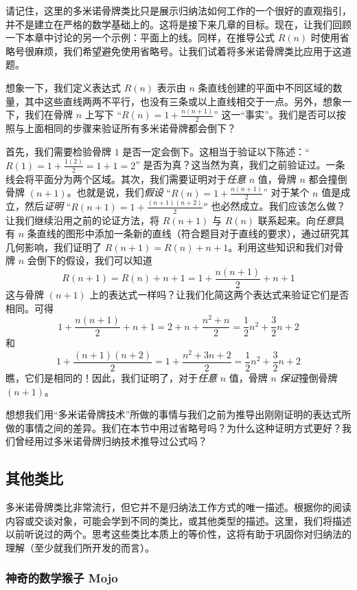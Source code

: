请记住，这里的多米诺骨牌类比只是展示归纳法如何工作的一个很好的直观指引，并不是建立在严格的数学基础上的。这将是接下来几章的目标。现在，让我们回顾一下本章中讨论的另一个示例：平面上的线。同样，在推导公式 $R(n)$ 时使用省略号很麻烦，我们希望避免使用省略号。让我们试着将多米诺骨牌类比应用于这道题。

想象一下，我们定义表达式 $R(n)$ 表示由 $n$ 条直线创建的平面中不同区域的数量，其中这些直线两两不平行，也没有三条或以上直线相交于一点。另外，想象一下，我们在骨牌 $n$ 上写下 ``$R(n) = 1 + \frac{n(n+1)}{2}$'' 这一``事实''。我们是否可以按照与上面相同的步骤来验证所有多米诺骨牌都会倒下？

首先，我们需要检验骨牌 $1$ 是否一定会倒下。这相当于验证以下陈述：``$R(1) = 1+\frac{1(2)}{2} = 1+1 = 2$'' 是否为真？这当然为真，我们之前验证过。一条线会将平面分为两个区域。其次，我们需要证明对于\textit{任意} $n$ 值，骨牌 $n$ 都会撞倒骨牌 $(n + 1)$。也就是说，我们\textit{假设} ``$R(n) = 1 + \frac{n(n+1)}{2}$'' 对于某个 $n$ 值是成立，然后\textit{证明} ``$R(n + 1) = 1 + \frac{(n+1)(n +2)}{2}''$ 也必然成立。我们应该怎么做？让我们继续沿用之前的论证方法，将 $R(n + 1)$ 与 $R(n)$ 联系起来。向\textit{任意}具有 $n$ 条直线的图形中添加一条新的直线（符合题目对于直线的要求），通过研究其几何影响，我们证明了 $R(n+ 1) = R(n) +n+ 1$。利用这些知识和我们对骨牌 $n$ 会倒下的假设，我们可以知道
\[R(n + 1) = R(n) + n + 1 = 1 +\frac{n(n+1)}{2}+ n + 1\]
这与骨牌 $(n + 1)$ 上的表达式一样吗？让我们化简这两个表达式来验证它们是否相同。可得
\[1 +\frac{n(n+1)}{2}+ n + 1=2+n+\frac{n^2+n}{2} = \frac{1}{2}n^2+\frac{3}{2}n+2\]
和
\[1 + \frac{(n+1)(n +2)}{2} = 1+\frac{n^2+3n+2}{2} =  \frac{1}{2}n^2+\frac{3}{2}n+2\]
瞧，它们是相同的！因此，我们证明了，对于\textit{任意} $n$ 值，骨牌 $n$ \textit{保证}撞倒骨牌 $(n+1)$。

想想我们用``多米诺骨牌技术''所做的事情与我们之前为推导出刚刚证明的表达式所做的事情之间的差异。我们在本节中用过省略号吗？为什么这种证明方式更好？我们曾经用过多米诺骨牌归纳技术推导过公式吗？

\subsection{其他类比}

多米诺骨牌类比非常流行，但它并不是归纳法工作方式的唯一描述。根据你的阅读内容或交谈对象，可能会学到不同的类比，或其他类型的描述。这里，我们将描述以前听说过的两个。思考这些类比本质上的等价性，这将有助于巩固你对归纳法的理解（至少就我们所开发的而言）。

\subsubsection*{神奇的数学猴子 Mojo}

